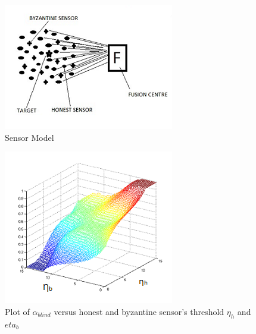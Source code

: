 \documentclass[conference]{IEEEtran}
\begin{document}
\begin{figure} [H]
\centering
\includegraphics{MODEL.png}
\caption{Sensor Model }
\label{F1}
\end{figure}
\begin{figure} [H]
\centering
\includegraphics{alpha_blind.png}
\caption{Plot of $\alpha_{blind}$ versus honest and byzantine sensor's threshold $\eta_h$ and $eta_b$ }
\label{F2}
\end{figure}
\end{document}
